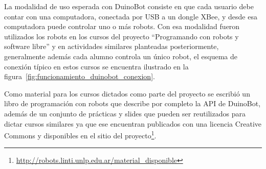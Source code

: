 La modalidad de uso esperada con DuinoBot consiste en que cada usuario
debe contar con una computadora, conectada por USB a un dongle XBee,
y desde esa computadora puede controlar uno o más robots. Con esa modalidad
fueron utilizados los robots en los cursos del proyecto
``Programando con robots y software libre'' y en actividades similares
planteadas posteriormente, generalmente además cada alumno controla
un único robot, el esquema de conexión típico en estos cursos se encuentra
ilustrado en la figura~\ref{fig:funcionamiento_duinobot_conexion}.

Como material para los cursos dictados como parte del proyecto \proyecto{}
se escribió un libro de programación con robots que describe por completo
la API de DuinoBot, además de un conjunto de prácticas y slides que pueden
ser reutilizados para dictar cursos similares ya que ese encuentran publicados
con una licencia Creative Commons y disponibles en el sitio del
proyecto\footnote{\url{http://robots.linti.unlp.edu.ar/material_disponible}}.

